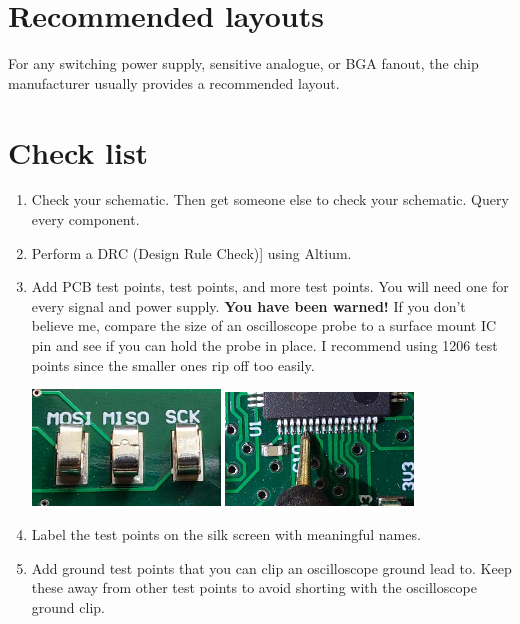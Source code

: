 \section{Recommended layouts}

For any switching power supply, sensitive analogue, or BGA fanout, the
chip manufacturer usually provides a recommended layout.

\section{Check list}
\label{PCB-check-list}

\begin{enumerate}
\item Check your schematic.  Then get someone else to check your
  schematic.  Query every component.

\item Perform a DRC (Design Rule Check)] using Altium.

\item Add PCB test points, test points, and more test points.  You
  will need one for every signal and power supply.  \textbf{You have
    been warned!}  If you don't believe me, compare the size of an
  oscilloscope probe to a surface mount IC pin and see if you can hold
  the probe in place.  I recommend using 1206 test points since the
  smaller ones rip off too easily.

  \includegraphics[width=5cm]{../guide/figs/testpoints.jpg}  \includegraphics[width=5cm]{../guide/figs/micro_probe_zoom.jpg}

\item Label the test points on the silk screen with meaningful names.

\item Add ground test points that you can clip an oscilloscope ground
  lead to.  Keep these away from other test points to avoid shorting
  with the oscilloscope ground clip.


\end{enumerate}
